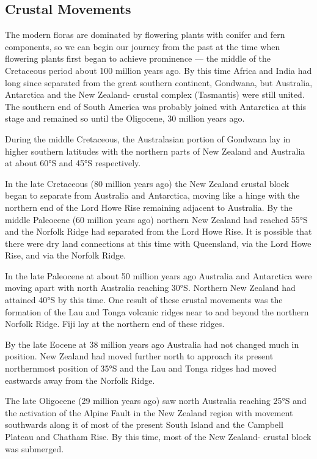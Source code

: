\subsection{Crustal Movements}

The modern floras are dominated by flowering plants with conifer and fern components, so we can begin our journey from the past at the time when flowering plants first began to achieve prominence --- the middle of the Cretaceous period about 100 million years ago.
By this time Africa and India had long since separated from the great southern continent, Gondwana, but Australia, Antarctica and the New Zealand- crustal complex (Tasmantis) were still united.
The southern end of South America was probably joined with Antarctica at this stage and remained so until the Oligocene, 30 million years ago.

During the middle Cretaceous, the Australasian portion of Gondwana lay in higher southern latitudes with the northern parts of New Zealand and Australia at about \ang{60}S and \ang{45}S respectively.

In the late Cretaceous (80 million years ago) the New Zealand crustal block began to separate from Australia and Antarctica, moving like a hinge with the northern end of the Lord Howe Rise remaining adjacent to Australia.
By the middle Paleocene (60 million years ago) northern New Zealand had reached \ang{55}S and the Norfolk Ridge had separated from the Lord Howe Rise.
It is possible that there were dry land connections at this time with Queensland, via the Lord Howe Rise, and  via the Norfolk Ridge.

In the late Paleocene at about 50 million years ago Australia and Antarctica were moving apart with north Australia reaching \ang{30}S.
Northern New Zealand had attained \ang{40}S by this time.
One result of these crustal movements was the formation of the Lau and Tonga volcanic ridges near to and beyond the northern Norfolk Ridge.
Fiji lay at the northern end of these ridges.

By the late Eocene at 38 million years ago Australia had not changed much in position.
New Zealand had moved further north to approach its present northernmost position of \ang{35}S and the Lau and Tonga ridges had moved eastwards away from the Norfolk Ridge.

The late Oligocene (29 million years ago) saw north Australia reaching \ang{25}S and the activation of the Alpine Fault in the New Zealand region with movement southwards along it of most of the present South Island and the Campbell Plateau and Chatham Rise.
By this time, most of the New Zealand- crustal block was submerged.

